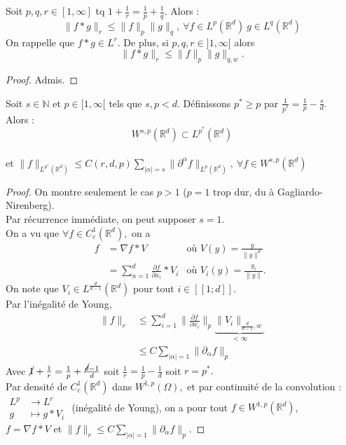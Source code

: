 \begin{theoreme}
    Soit $p,q,r\in [1,\infty ]$ tq $1+\frac{1}{r}=\frac{1}{p}+\frac{1}{q}.$ Alors :
    $$\|f*g\|_r\le \|f\|_p\|g\|_q,\ \forall f\in L^p(\mathbb{R} ^d)\ g\in L^q(\mathbb{R} ^d)$$
    On rappelle que $f*g\in L^r.$ De plus, si $p,q,r\in ]1,\infty [$ alors
    $$\|f*g\|_r\le \|f\|_p\|g\|_{q,w}.$$
\end{theoreme}
\begin{proof}
    Admis.
\end{proof}
\begin{theoreme}
    Soit $s\in \mathbb{N} $ et $p\in [1,\infty [$ tels que $s,p<d.$ Définissons $p^*\ge p$ par $\frac{1}{p^*}=\frac{1}{p}-\frac{s}{d}.$ \\
    Alors :
    $$W^{s,p}(\mathbb{R} ^d)\subset L^{p^*}(\mathbb{R} ^d)$$\\
    et $\|f\|_{L^{p^*}(\mathbb{R} ^d)}\le C(r,d,p)\sum\limits_{|\alpha | =s}^{} \|\partial^\alpha f\|_{L^p(\mathbb{R} ^d)},\ \forall f\in W^{s,p}(\mathbb{R} ^d)$
\end{theoreme}
\begin{proof}
    On montre seulement le cas $p>1$ ($p=1$ trop dur, du à Gagliardo-Nirenberg). \\
    Par récurrence immédiate, on peut supposer $s=1$.\\
    On a vu que $\forall f\in C^1_c(\mathbb{R} ^d), $ on a
    \begin{align*}
        f&= \nabla f*V &\text{où $V(y)=\frac{y}{\|y\|^d}$ }\\
         &= \sum\limits_{n=1}^{d} \frac{\partial f}{\partial x_i} *V_i &\text{où } V_i(y)=\frac{y_i}{\|y\|}.
    \end{align*}
    On note que $V_i\in L^{\frac{d}{d-1}}(\mathbb{R} ^d)$ pour tout $i\in [\![1;d]\!].$ \\
    Par l'inégalité de Young,
    \begin{align*}
        \|f\|_r &\le \sum\limits_{i=1}^{d} \|\frac{\partial f}{\partial x_i} \|_p\underbrace{\|V_i\|_{\frac{d}{d-1},w}}_{<\infty }\\
                &\le C \sum\limits_{|\alpha | =1}^{} \|\partial_\alpha f\|_p
    \end{align*}
    Avec $\cancel{1}+\frac{1}{r}=\frac{1}{p}+\frac{\cancel{d}-1}{d}$ soit $\frac{1}{r}=\frac{1}{p}-\frac{1}{d}$ soit $r=p^*.$ \\
    Par densité de $C_c^1(\mathbb{R} ^d)$ dans $W^{1,p}(\Omega),$ et par continuité de la convolution : $ \begin{aligned}
         L^p&\longrightarrow L^r \\
        g &\longmapsto g*V_i
    \end{aligned}$ (inégalité de Young), on a pour tout $f\in W^{1,p}(\mathbb{R} ^d)$,\\ $f=\nabla f*V$ et $\|f\|_r\le C \sum\limits_{|\alpha | =1}^{} \|\partial_\alpha f\|_p.$
\end{proof}
